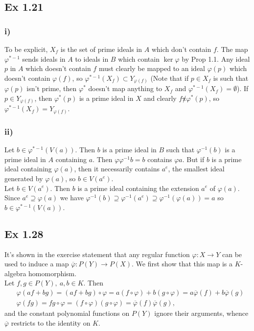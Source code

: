 \documentclass{article}
\let\temp\phi
\let\phi\varphi
\let\varphi\temp
\theoremstyle{definition}
\begin{document}
\subsection*{Ex 1.21}

\subsubsection*{i)}
To be explicit, $X_f$ is the set of prime ideals in $A$ which don't contain $f$. The map $\phi^{*-1}$ sends ideals in $A$ to ideals in $B$ which contain $\ker \phi$ by Prop 1.1. Any ideal $p$ in $A$ which doesn't contain $f$ must clearly be mapped to an ideal $\phi(p)$ which doesn't contain $\phi(f)$, so $\phi^{*-1}(X_f) \subset Y_{\phi(f)}$ (Note that if $p \in X_f$ is such that $\phi(p)$ isn't prime, then $\phi^*$ doesn't map anything to $X_f$ and $\phi^{*-1}(X_f) = \emptyset$). If $p \in Y_{\phi(f)}$, then $\phi^*(p)$ is a prime ideal in $X$ and clearly $f \not \pi \phi^*(p)$, so $\phi^{*-1}(X_f) = Y_{\phi(f)}$.

\subsubsection*{ii)}
Let $b \in \phi^{*-1}(V(a))$. Then $b$ is a prime ideal in $B$ such that $\phi^{-1}(b)$ is a prime ideal in $A$ containing $a$. Then $\phi \phi^{-1} b = b$ contains $\phi a$. But if $b$ is a prime ideal containing $\phi(a)$, then it necessarily contains $a^e$, the smallest ideal generated by $\phi(a)$, so $b \in V(a^e)$. \\

Let $b \in V(a^e)$. Then $b$ is a prime ideal containing the extension $a^e$ of
$\phi(a)$. Since $a^e \supseteq \phi(a)$ we have $\phi^{-1}(b) \supseteq
	\phi^{-1}(a^e) \supseteq \phi^{-1}(\phi(a)) = a$ so $b \in \phi^{*-1}(V(a))$.
\\

\subsection*{Ex 1.28}
It's shown in the exercise statement that any regular function $\phi : X \to Y$ can be
used to induce a map $\overline{\phi} : P(Y) \to P(X)$. We first show that this map
is a $K$-algebra homomorphism. \\

Let $f, g \in P(Y),\ a, b \in K$. Then
\begin{align*}
	&\phi(af + bg) = (af + bg) \circ \phi = a (f \circ \phi) + b (g \circ \phi)
	= a\overline{\phi}(f) + b \overline{\phi}(g) \\
	&\phi(fg) = fg \circ \phi = (f \circ \phi) (g \circ \phi) =
	\overline{\phi}(f)\overline{\phi}(g),
\end{align*}
and the constant polynomial functions on $P(Y)$ ignore their arguments, whence
$\overline{\phi}$ restricts to the identity on $K$. \\
\end{document}
